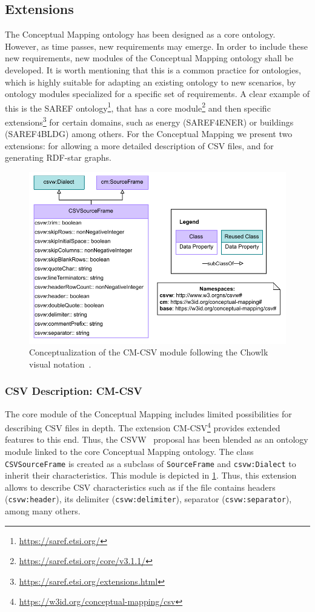 \subsection{Extensions}
\label{sec:chp4_cm-extensions}
The Conceptual Mapping ontology has been designed as a core ontology. However, as time passes, new requirements may emerge. In order to include these new requirements, new modules of the Conceptual Mapping ontology shall be developed. It is worth mentioning that this is a common practice for ontologies, which is highly suitable for adapting an existing ontology to new scenarios, by ontology modules specialized for a specific set of requirements. A clear example of this is the SAREF ontology\footnote{\url{https://saref.etsi.org/}}, that has a core module\footnote{\url{https://saref.etsi.org/core/v3.1.1/}} and then specific extensions\footnote{\url{https://saref.etsi.org/extensions.html}} for certain domains, such as energy (SAREF4ENER) or buildings (SAREF4BLDG) among others. For the Conceptual Mapping we present two extensions: for allowing a more detailed description of CSV files, and for generating RDF-star graphs.


\begin{figure}[!t]
\centering
\includegraphics[width=0.8\linewidth]{figures/chp4-2_cm-csv.pdf}
\caption[CM-CSV module]{Conceptualization of the CM-CSV module following the Chowlk visual notation~\parencite{feria2022chowlk}.}
\label{fig:chp4-2_cm-csv}
\end{figure}


\subsubsection{CSV Description: CM-CSV}
The core module of the Conceptual Mapping includes limited possibilities for describing CSV files in depth. The extension CM-CSV\footnote{\url{https://w3id.org/conceptual-mapping/csv}} provides extended features to this end. Thus, the CSVW~\parencite{Tennison2015csvw} proposal has been blended as an ontology module linked to the core Conceptual Mapping ontology. The class \texttt{CSVSourceFrame} is created as a subclass of \texttt{SourceFrame} and \texttt{csvw:Dialect} to inherit their characteristics. This module is depicted in \cref{fig:chp4-2_cm-csv}. Thus, this extension allows to describe CSV characteristics such as if the file contains headers (\texttt{csvw:header}), its delimiter (\texttt{csvw:delimiter}), separator (\texttt{csvw:separator}), among many others. 

